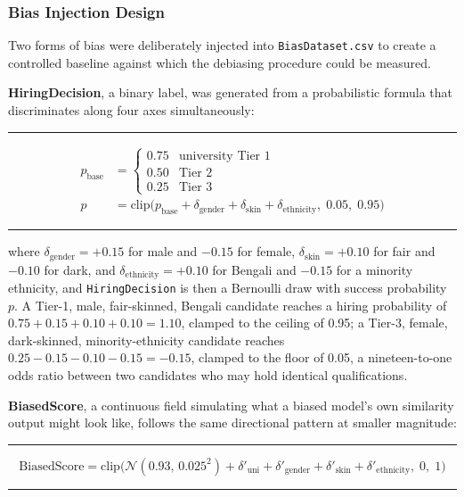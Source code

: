 \documentclass[11pt,a4paper]{article}
\newcommand{\code}[1]{\texttt{\footnotesize #1}}
\newenvironment{formulabox}
  {\begin{center}\color{TPteal}\rule{0.92\linewidth}{0.8pt}\par\vspace{5pt}\color{TPnavy}}
  {\par\vspace{3pt}\color{TPteal}\rule{0.92\linewidth}{0.8pt}\end{center}}
\begin{document}
\subsubsection{Bias Injection Design}
\label{sec:mod1-biasinjection}

Two forms of bias were deliberately injected into \code{BiasDataset.csv} to create a controlled baseline against which the debiasing procedure could be measured.

\textbf{HiringDecision}, a binary label, was generated from a probabilistic formula that discriminates along four axes simultaneously:

\begin{formulabox}
\begin{align}
\label{eq:hiring}
p_{\text{base}} &= \begin{cases} 0.75 & \text{university Tier 1} \\ 0.50 & \text{Tier 2} \\ 0.25 & \text{Tier 3} \end{cases} \nonumber \\
p &= \mathrm{clip}\big(p_{\text{base}} + \delta_{\text{gender}} + \delta_{\text{skin}} + \delta_{\text{ethnicity}},\; 0.05,\; 0.95\big)
\end{align}
\end{formulabox}

where $\delta_{\text{gender}} = +0.15$ for male and $-0.15$ for female, $\delta_{\text{skin}} = +0.10$ for fair and $-0.10$ for dark, and $\delta_{\text{ethnicity}} = +0.10$ for Bengali and $-0.15$ for a minority ethnicity, and \code{HiringDecision} is then a Bernoulli draw with success probability $p$. A Tier-1, male, fair-skinned, Bengali candidate reaches a hiring probability of $0.75+0.15+0.10+0.10=1.10$, clamped to the ceiling of 0.95; a Tier-3, female, dark-skinned, minority-ethnicity candidate reaches $0.25-0.15-0.10-0.15=-0.15$, clamped to the floor of 0.05, a nineteen-to-one odds ratio between two candidates who may hold identical qualifications.

\textbf{BiasedScore}, a continuous field simulating what a biased model's own similarity output might look like, follows the same directional pattern at smaller magnitude:

\begin{formulabox}
\begin{equation}
\label{eq:biasedscore}
\mathrm{BiasedScore} = \mathrm{clip}\big(\mathcal{N}(0.93,\,0.025^2) + \delta'_{\text{uni}} + \delta'_{\text{gender}} + \delta'_{\text{skin}} + \delta'_{\text{ethnicity}},\; 0,\; 1\big)
\end{equation}
\end{formulabox}
\end{document}
